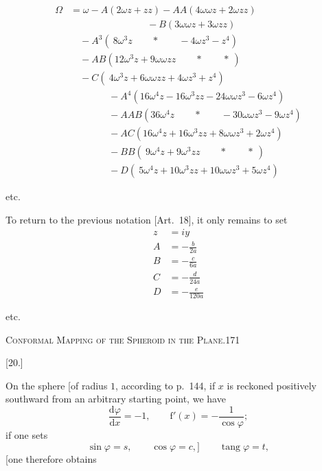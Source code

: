 \[
\begin{aligned}
\Omega&=\omega-A(2\omega z+zz)-AA(4\omega\omega z+2\omega zz)\\
&\qquad\qquad\qquad\qquad-B(3\omega\omega z+3\omega zz)\\[5pt]
&\quad-A^3(\ 8\omega^3z\qquad\ast\qquad-4\omega z^3-z^4)\\
&\quad-AB(12\omega^3z+9\omega\omega zz\qquad\ast\qquad\ast\ )\\
&\quad-C(\ 4\omega^3z+6\omega\omega zz+4\omega z^3+z^4)\\[5pt]
&\qquad\qquad-A^4(16\omega^4z-16\omega^3zz-24\omega\omega z^3-6\omega z^4)\\
&\qquad\qquad-AAB(36\omega^4z\qquad\ast\qquad-30\omega\omega z^3-9\omega z^4)\\
&\qquad\qquad-AC(16\omega^4z+16\omega^3zz+8\omega\omega z^3+2\omega z^4)\\
&\qquad\qquad-BB(\ 9\omega^4z+9\omega^3zz\qquad\ast\qquad\ast\ )\\
&\qquad\qquad-D(\ 5\omega^4z+10\omega^3zz+10\omega\omega z^3+5\omega z^4)
\end{aligned}
\]
\begin{center}etc.\end{center}
\par\endgroup
To return to the previous notation [Art.~18], it only remains to set
\[
\begin{aligned}
z&=iy\\[5pt]
A&=-\frac b{2a}\\[5pt]
B&=-\frac c{6a}\\[5pt]
C&=-\frac d{24a}\\[5pt]
D&=-\frac e{120a}
\end{aligned}
\]
\begin{center}etc.\end{center}
\clearpage
\noindent\mbox{}\hfill\textsc{Conformal Mapping of the Spheroid in the Plane.}\hfill171\par\medskip
\begin{center}[20.]\end{center}
On the sphere [of radius $1$, according to p.~144, if $x$ is reckoned positively southward from an arbitrary starting point, we have
\[
\frac{\mathrm d\varphi}{\mathrm dx}=-1,\qquad\mathrm f'(x)=-\frac1{\cos\varphi};
\]
if one sets
\[
\sin\varphi=s,\qquad\cos\varphi=c,]\qquad\operatorname{tang}\varphi=t,
\]
[one therefore obtains
\begingroup\small
